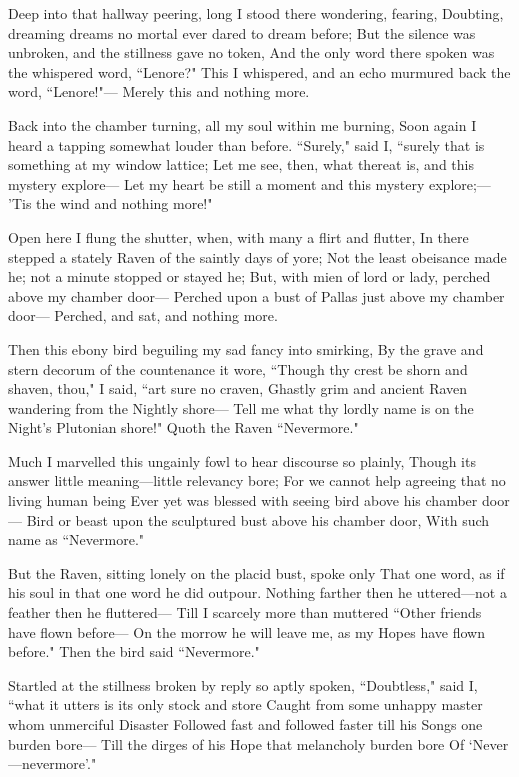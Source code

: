 \documentclass{article}
\begin{document}
Deep into that hallway peering, long I stood there wondering, fearing,
Doubting, dreaming dreams no mortal ever dared to dream before;
But the silence was unbroken, and the stillness gave no token,
And the only word there spoken was the whispered word, ``Lenore?"
This I whispered, and an echo murmured back the word, ``Lenore!"---
Merely this and nothing more.

Back into the chamber turning, all my soul within me burning,
Soon again I heard a tapping somewhat louder than before.
``Surely," said I, ``surely that is something at my window lattice;
Let me see, then, what thereat is, and this mystery explore---
Let my heart be still a moment and this mystery explore;---
’Tis the wind and nothing more!"

Open here I flung the shutter, when, with many a flirt and flutter,
In there stepped a stately Raven of the saintly days of yore;
Not the least obeisance made he; not a minute stopped or stayed he;
But, with mien of lord or lady, perched above my chamber door---
Perched upon a bust of Pallas just above my chamber door---
Perched, and sat, and nothing more.

Then this ebony bird beguiling my sad fancy into smirking,
By the grave and stern decorum of the countenance it wore,
``Though thy crest be shorn and shaven, thou," I said, ``art sure no craven,
Ghastly grim and ancient Raven wandering from the Nightly shore---
Tell me what thy lordly name is on the Night’s Plutonian shore!"
Quoth the Raven ``Nevermore."

Much I marvelled this ungainly fowl to hear discourse so plainly,
Though its answer little meaning---little relevancy bore;
For we cannot help agreeing that no living human being
Ever yet was blessed with seeing bird above his chamber door---
Bird or beast upon the sculptured bust above his chamber door,
With such name as ``Nevermore."

But the Raven, sitting lonely on the placid bust, spoke only
That one word, as if his soul in that one word he did outpour.
Nothing farther then he uttered---not a feather then he fluttered---
Till I scarcely more than muttered ``Other friends have flown before---
On the morrow he will leave me, as my Hopes have flown before."
Then the bird said ``Nevermore."

Startled at the stillness broken by reply so aptly spoken,
``Doubtless," said I, ``what it utters is its only stock and store
Caught from some unhappy master whom unmerciful Disaster
Followed fast and followed faster till his Songs one burden bore---
Till the dirges of his Hope that melancholy burden bore
Of ‘Never---nevermore’."
\end{document}

